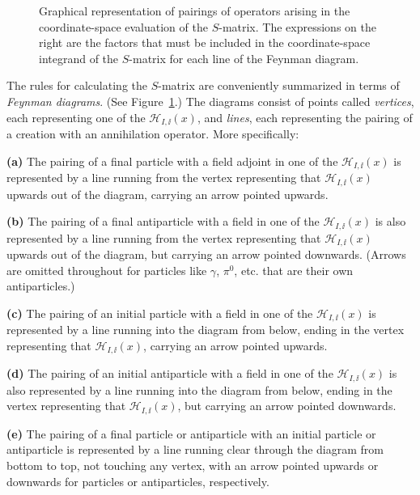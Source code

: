 \begingroup
\renewcommand{\thefigure}{6.\arabic{figure}}
\setcounter{figure}{0}
\begin{figure}[htbp]

\caption{Graphical representation of pairings of operators arising in the
coordinate-space evaluation of the $S$-matrix. The expressions on the right
are the factors that must be included in the coordinate-space integrand of the
$S$-matrix for each line of the Feynman diagram.}
\label{fig:6.1}
\end{figure}
\endgroup

The rules for calculating the $S$-matrix are conveniently summarized in terms
of \emph{Feynman diagrams}. (See Figure~\ref{fig:6.1}.) The diagrams consist of points
called \emph{vertices}, each representing one of the $\mathcal H_{I,\ii}(x)$, and
\emph{lines}, each representing the pairing of a creation with an annihilation
operator. More specifically:

\noindent\textbf{(a)} The pairing of a final particle with a field adjoint in
one of the $\mathcal H_{I,\ii}(x)$ is represented by a line running from the vertex
representing that $\mathcal H_{I,\ii}(x)$ upwards out of the diagram, carrying an
arrow pointed upwards.

\noindent\textbf{(b)} The pairing of a final antiparticle with a field in one
of the $\mathcal H_{I,\ii}(x)$ is also represented by a line running from the vertex
representing that $\mathcal H_{I,\ii}(x)$ upwards out of the diagram, but carrying
an arrow pointed downwards. (Arrows are omitted throughout for particles like
$\gamma$, $\pi^0$, etc. that are their own antiparticles.)

\noindent\textbf{(c)} The pairing of an initial particle with a field in one
of the $\mathcal H_{I,\ii}(x)$ is represented by a line running into the diagram from
below, ending in the vertex representing that $\mathcal H_{I,\ii}(x)$, carrying an
arrow pointed upwards.

\noindent\textbf{(d)} The pairing of an initial antiparticle with a field in
one of the $\mathcal H_{I,\ii}(x)$ is also represented by a line running into the
diagram from below, ending in the vertex representing that $\mathcal H_{I,\ii}(x)$,
but carrying an arrow pointed downwards.

\noindent\textbf{(e)} The pairing of a final particle or antiparticle with an
initial particle or antiparticle is represented by a line running clear
through the diagram from bottom to top, not touching any vertex, with an arrow
pointed upwards or downwards for particles or antiparticles, respectively.

